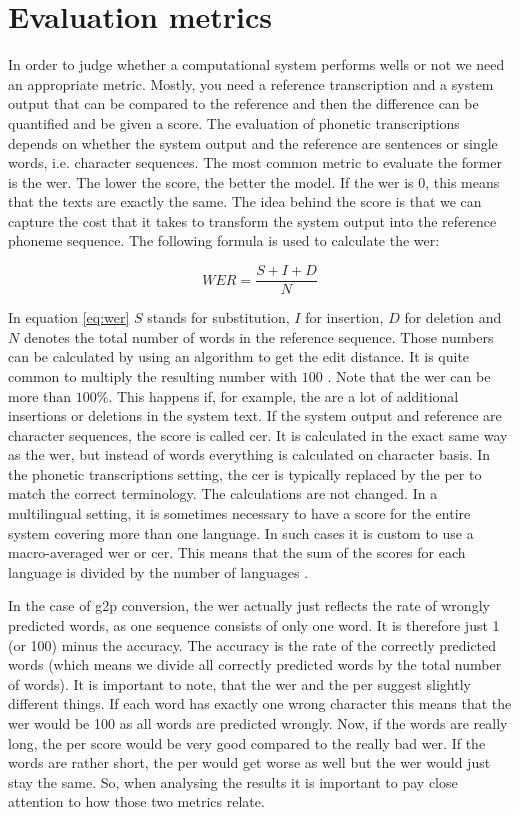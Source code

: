 \section{Evaluation metrics}
In order to judge whether a computational system performs wells or not we need an appropriate metric. Mostly, you need a reference transcription and a system output that can be compared to the reference and then the difference can be quantified and be given a score. The evaluation of phonetic transcriptions depends on whether the system output and the reference are sentences or single words, i.e. character sequences. The most common metric to evaluate the former is the \ac{wer}. The lower the score, the better the model. If the \ac{wer} is 0, this means that the texts are exactly the same. The idea behind the score is that we can capture the cost that it takes to transform the system output into the reference phoneme sequence. The following formula is used to calculate the \ac{wer}:    

\begin{equation}
\label{eq:wer}
WER = \frac{S+I+D}{N}
\end{equation} 


In equation \ref{eq:wer} $S$ stands for substitution, $I$ for insertion, $D$ for deletion and $N$ denotes the total number of words in the reference sequence. Those numbers can be calculated by using an algorithm to get the edit distance. It is quite common to multiply the resulting number with $100$ \citep{gorman-etal-2020-sigmorphon}. Note that the \ac{wer} can be more than $100$\%. This happens if, for example, the are a lot of additional insertions or deletions in the system text. If the system output and reference are character sequences, the score is called \acf{cer}. It is calculated in the exact same way as the \ac{wer}, but instead of words everything is calculated on character basis. In the phonetic transcriptions setting, the \ac{cer} is typically replaced by the \acf{per} to match the correct terminology. The calculations are not changed. In a multilingual setting, it is sometimes necessary to have a score for the entire system covering more than one language. In such cases it is custom to use a macro-averaged \ac{wer} or \ac{cer}. This means that the sum of the scores for each language is divided by the number of languages \citep{Leung.2021}.

In the case of \ac{g2p} conversion, the \ac{wer} actually just reflects the rate of wrongly predicted words, as one sequence consists of only one word. It is therefore just 1 (or 100) minus the accuracy. The accuracy is the rate of the correctly predicted words (which means we divide all correctly predicted words by the total number of words). It is important to note, that the \ac{wer} and the \ac{per} suggest slightly different things. If each word has exactly one wrong character this means that the \ac{wer} would be 100 as all words are predicted wrongly. Now, if the words are really long, the \ac{per} score would be very good compared to the really bad \ac{wer}. If the words are rather short, the \ac{per} would get worse as well but the \ac{wer} would just stay the same. So, when analysing the results it is important to pay close attention to how those two metrics relate.

